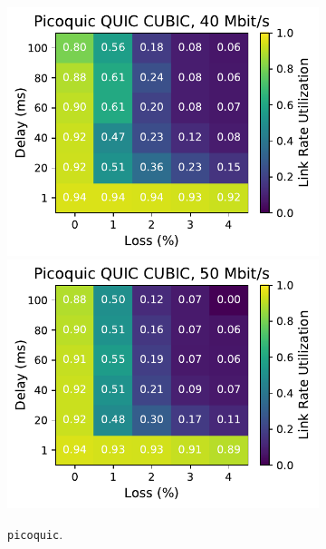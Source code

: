 \begin{figure}[ht]
\begin{subfigure}[b]{0.22\linewidth}
        \includegraphics[width=\linewidth,trim={0 0 2cm 0},clip]{splitting-paper/figures/heatmaps/heatmap_picoquic_cubic_40mbps.pdf}
        \includegraphics[width=\linewidth,trim={0 0 2cm 0},clip]{splitting-paper/figures/heatmaps/heatmap_picoquic_cubic_50mbps.pdf}
        \caption{\texttt{picoquic}.}
    \end{subfigure}
    \begin{subfigure}[b]{0.89cm}

\end{subfigure}
\end{figure}
